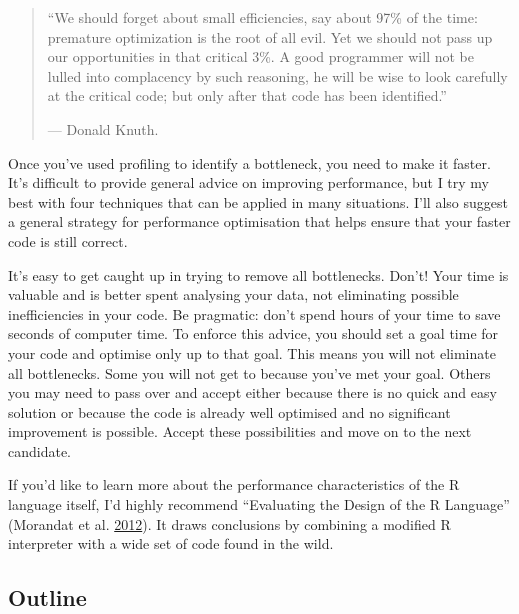 \documentclass[]{book}
\begin{document}

\begin{quote}
``We should forget about small efficiencies, say about 97\% of the time:
premature optimization is the root of all evil. Yet we should not pass up our
opportunities in that critical 3\%. A good programmer will not be lulled
into complacency by such reasoning, he will be wise to look carefully at
the critical code; but only after that code has been identified.''

\hspace*{\fill} --- Donald Knuth.
\end{quote}

Once you've used profiling to identify a bottleneck, you need to make it faster. It's difficult to provide general advice on improving performance, but I try my best with four techniques that can be applied in many situations. I'll also suggest a general strategy for performance optimisation that helps ensure that your faster code is still correct.

It's easy to get caught up in trying to remove all bottlenecks. Don't! Your time is valuable and is better spent analysing your data, not eliminating possible inefficiencies in your code. Be pragmatic: don't spend hours of your time to save seconds of computer time. To enforce this advice, you should set a goal time for your code and optimise only up to that goal. This means you will not eliminate all bottlenecks. Some you will not get to because you've met your goal. Others you may need to pass over and accept either because there is no quick and easy solution or because the code is already well optimised and no significant improvement is possible. Accept these possibilities and move on to the next candidate.

If you'd like to learn more about the performance characteristics of the R language itself, I'd highly recommend ``Evaluating the Design of the R Language'' (Morandat et al. \protect\hyperlink{ref-r-design}{2012}). It draws conclusions by combining a modified R interpreter with a wide set of code found in the wild.

\hypertarget{outline-7}{%
\subsection*{Outline}\label{outline-7}}
\end{document}
